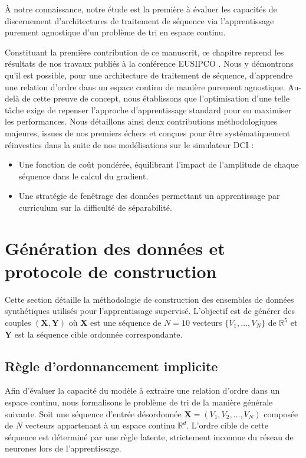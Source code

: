 À notre connaissance, notre étude \cite{cornu_learning_2025} est la première à évaluer les capacités de discernement d'architectures de traitement de séquence via l'apprentissage purement agnostique d'un problème de tri en espace continu.

Constituant la première contribution de ce manuscrit, ce chapitre reprend les résultats de nos travaux publiés à la conférence EUSIPCO \cite{cornu_learning_2025}. Nous y démontrons qu'il est possible, pour une architecture de traitement de séquence, d'apprendre une relation d'ordre dans un espace continu de manière purement agnostique. Au-delà de cette preuve de concept, nous établissons que l'optimisation d'une telle tâche exige de repenser l'approche d'apprentissage standard pour en maximiser les performances. Nous détaillons ainsi deux contributions méthodologiques majeures, issues de nos premiers échecs et conçues pour être systématiquement réinvesties dans la suite de nos modélisations sur le simulateur DCI :

\begin{itemize}
\item Une fonction de coût pondérée, équilibrant l'impact de l'amplitude de chaque séquence dans le calcul du gradient.
\item Une stratégie de fenêtrage des données permettant un apprentissage par curriculum sur la difficulté de séparabilité.
\end{itemize}


\section{Génération des données et protocole de construction}

Cette section détaille la méthodologie de construction des ensembles de données synthétiques utilisés pour l'apprentissage supervisé. L'objectif est de générer des couples $(\mathbf{X}, \mathbf{Y})$ où $\mathbf{X}$ est une séquence de $N=10$ vecteurs $\{V_1, \dots, V_N\}$ de $\mathbb{R}^5$ et $\mathbf{Y}$ est la séquence cible ordonnée correspondante.

\subsection{Règle d'ordonnancement implicite}
\label{seq:ordreg}
Afin d'évaluer la capacité du modèle à extraire une relation d'ordre dans un espace continu, nous formalisons le problème de tri de la manière générale suivante. Soit une séquence d'entrée désordonnée $\mathbf{X} = (V_1, V_2, \dots, V_{N})$ composée de $N$ vecteurs appartenant à un espace continu $\mathbb{R}^d$. L'ordre cible de cette séquence est déterminé par une règle latente, strictement inconnue du réseau de neurones lors de l'apprentissage.\\

